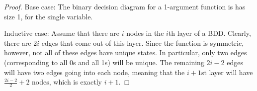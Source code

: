\documentclass{amsart}
\begin{document}
\begin{enumerate}
\begin{proof}
  Base case: The binary decision diagram for a 1-argument function is has size
  1, for the single variable.

  Inductive case:  Assume that there are $i$ nodes in the $i$th layer of a BDD.
  Clearly, there are $2i$ edges that come out of this layer.
  Since the function is symmetric, however, not all of these edges have unique
  states.  In particular, only two edges (corresponding to all 0s and all 1s)
  will be unique.  The remaining $2i - 2$ edges will have two edges going into
  each node, meaning that the $i+1$st layer will have $\frac{2i -2}{2} + 2$
  nodes, which is exactly $i+1$.
\end{proof}
\end{enumerate}
\end{document}
